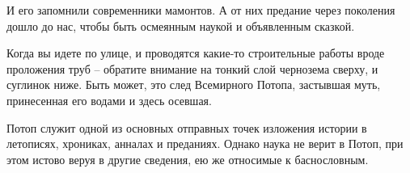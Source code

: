    И его запомнили современники мамонтов. А от них предание через поколения дошло до нас, чтобы быть осмеянным наукой и объявленным сказкой.

   Когда вы идете по улице, и проводятся какие-то строительные работы вроде проложения труб – обратите внимание на тонкий слой чернозема сверху, и суглинок ниже. Быть может, это след Всемирного Потопа, застывшая муть, принесенная его водами и здесь осевшая.

Потоп служит одной из основных отправных точек изложения истории в летописях, хрониках, анналах и преданиях. Однако наука не верит в Потоп, при этом истово веруя в другие сведения, ею же относимые к баснословным.
